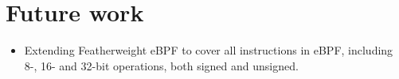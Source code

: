 \section{Future work}
\label{sec:future_work}

\begin{itemize}
\item Extending Featherweight eBPF to cover all instructions in eBPF, including 8-, 16- and 32-bit operations, both signed and unsigned. 

\end{itemize}
